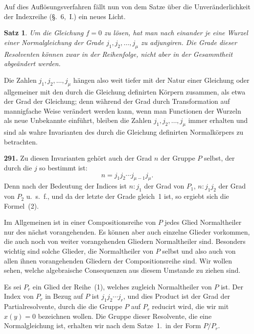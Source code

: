 \documentclass[12pt,a4paper]{article}
\newtheorem*{satz}{Satz}
\begin{document}
Auf dies Aufl\"osungsverfahren f\"allt nun von dem Satze \"uber die Unver\"anderlichkeit der Indexreihe (\S.~6,~I.) ein neues Licht.

\begin{satz}
Um die Gleichung $f=0$ zu l\"osen, hat man nach einander je eine Wurzel einer Normalgleichung der Grade $j_1,j_2,\ldots,j_{\mu}$ zu adjungiren. Die Grade dieser Resolventen k\"onnen zwar in der Reihenfolge, nicht aber in der Gesammtheit abge\"andert werden.
\end{satz}

Die Zahlen $j_1,j_2,\ldots,j_{\mu}$ h\"angen also weit tiefer mit der Natur einer Gleichung oder allgemeiner mit den durch die Gleichung definirten K\"orpern zusammen, als etwa der Grad der Gleichung; denn w\"ahrend der Grad durch Transformation auf mannigfache Weise ver\"andert werden kann, wenn man Functionen der Wurzeln als neue Unbekannte einf\"uhrt, bleiben die Zahlen $j_1,j_2,\ldots,j_{\mu}$ immer erhalten und sind als wahre Invarianten des durch die Gleichung definirten Normalk\"orpers zu betrachten.

\bigskip
\noindent\textbf{291.} Zu diesen Invarianten geh\"ort auch der Grad $n$ der Gruppe $P$ selbst, der durch die $j$ so bestimmt ist:
\begin{equation}
\tag{2}
n = j_1 j_2 \cdots j_{\mu-1} j_{\mu}.
\end{equation}
Denn nach der Bedeutung der Indices ist $n:j_1$ der Grad von $P_1$, $n:j_1 j_2$ der Grad von $P_2$ u.~s.~f., und da der letzte der Grade gleich~1 ist, so ergiebt sich die Formel~(2).

Im Allgemeinen ist in einer Compositionsreihe von $P$ jedes Glied Normaltheiler nur des n\"achst vorangehenden. Es k\"onnen aber auch einzelne Glieder vorkommen, die auch noch von weiter vorangehenden Gliedern Normaltheiler sind. Besonders wichtig sind solche Glieder, die Normaltheiler von $P$ selbst und also auch von allen ihnen vorangehenden Gliedern der Compositionsreihe sind. Wir wollen sehen, welche algebraische Consequenzen aus diesem Umstande zu ziehen sind.

Es sei $P_r$ ein Glied der Reihe~(1), welches zugleich Normaltheiler von $P$ ist. Der Index von $P_r$ in Bezug auf $P$ ist $j_1 j_2 \cdots j_r$, und dies Product ist der Grad der Partialresolvente, durch die die Gruppe $P$ auf $P_r$ reducirt wird, die wir mit $x(y)=0$ bezeichnen wollen. Die Gruppe dieser Resolvente, die eine Normalgleichung ist, erhalten wir nach dem Satze~1.\ in der Form $P/P_r$.
\end{document}
